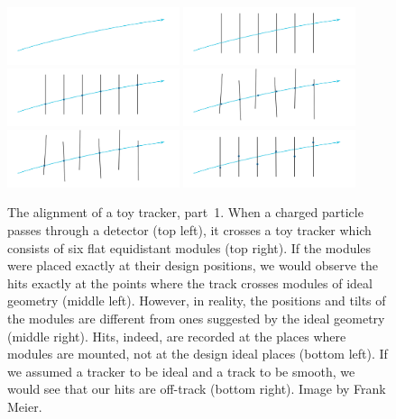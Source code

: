 \begin{figure}[htb]
    \begin{center}
        \includegraphics[width=0.45\textwidth]{../figs/Alignment/toyTracker01.png}
        \includegraphics[width=0.45\textwidth]{../figs/Alignment/toyTracker02.png}
        \includegraphics[width=0.45\textwidth]{../figs/Alignment/toyTracker03.png}
        \includegraphics[width=0.45\textwidth]{../figs/Alignment/toyTracker04.png}
        \includegraphics[width=0.45\textwidth]{../figs/Alignment/toyTracker05.png}
        \includegraphics[width=0.45\textwidth]{../figs/Alignment/toyTracker06.png}
    \end{center}
    \caption{The alignment of a toy tracker, part~1. When a charged particle passes through a detector (top left), it crosses a toy tracker which consists of six flat equidistant modules (top right). If the modules were placed exactly at their design positions, we would observe the hits exactly at the points where the track crosses modules of ideal geometry (middle left). However, in reality, the positions and tilts of the modules are different from ones suggested by the ideal geometry (middle right). Hits, indeed, are recorded at the places where modules are mounted, not at the design ideal places (bottom left). If we assumed a tracker to be ideal and a track to be smooth, we would see that our hits are off-track (bottom right). Image by Frank Meier.}
    \label{fig:toyTracker_part1}
\end{figure}

